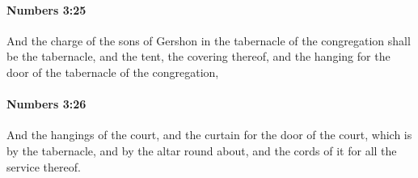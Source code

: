 		\paragraph{Numbers 3:25} %
			\label{NUMBERS-3-25}

			And the charge of the sons of Gershon in the tabernacle of the congregation shall be the tabernacle, and the tent, the covering thereof, and the hanging for the door of the tabernacle of the congregation,


		\paragraph{Numbers 3:26} %
			\label{NUMBERS-3-26}

			And the hangings of the court, and the curtain for the door of the court, which is by the tabernacle, and by the altar round about, and the cords of it for all the service thereof.


